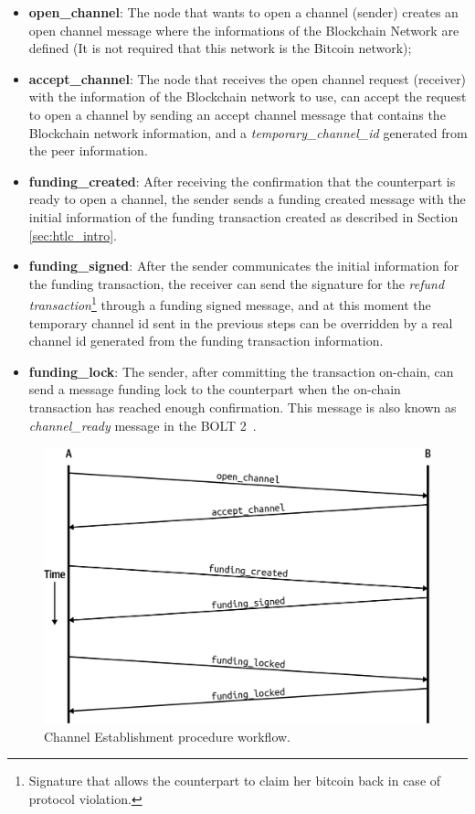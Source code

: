 \begin{itemize}
  \item {\bf open\_channel}: The node that wants to open a channel (sender) creates an open channel message where the informations of the
        Blockchain Network are defined (It is not required that this network is the Bitcoin network);
  \item {\bf accept\_channel}: The node that receives the open channel request (receiver) with the information of the Blockchain network to use,
        can accept the request to open a channel by sending an accept channel message that contains the Blockchain network information, and
        a \emph{temporary\_channel\_id} generated from the peer information.
  \item {\bf funding\_created}: After receiving the confirmation that the counterpart is ready to open a channel, the sender
        sends a funding created message with the initial information of the funding transaction created as described in Section \ref{sec:htlc_intro}.
  \item {\bf funding\_signed}: After the sender communicates the initial information for the funding transaction, the
        receiver can send the signature for the \emph{refund transaction}\footnote{Signature that allows the counterpart to claim her bitcoin back in case of protocol violation.} through a funding signed message, and at this moment the temporary
        channel id sent in the previous steps can be overridden by a real channel id generated from the funding transaction information.
  \item {\bf funding\_lock}: The sender, after committing the transaction on-chain, can send a message funding lock to the counterpart when
        the on-chain transaction has reached enough confirmation. This message is also known as \emph{channel\_ready} message in the BOLT 2~\cite{bolt2}.
\end{itemize}

\begin{figure}[h]
  \begin{center}
  \includegraphics[width=0.6\columnwidth]{imgs/mtln_0703.png}
  \end{center}
    \caption{Channel Establishment procedure workflow.~\cite{lnbook}}
  \label{fig:channel-establishment}
\end{figure}

